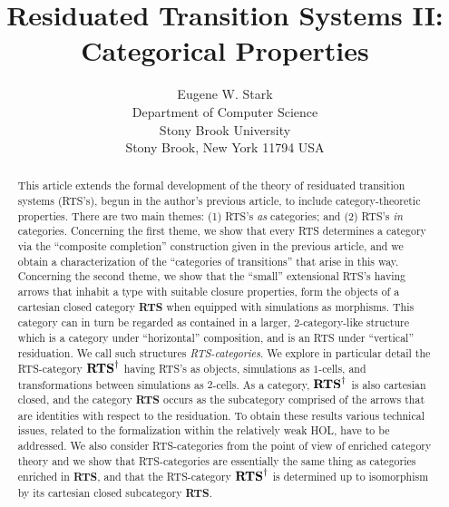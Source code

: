 \documentclass[11pt,notitlepage,a4paper]{report}
\begin{document}
\title{Residuated Transition Systems II:\\ Categorical Properties}
\author{Eugene W. Stark\\[\medskipamount]
        Department of Computer Science\\
        Stony Brook University\\
        Stony Brook, New York 11794 USA}
\maketitle

\begin{abstract}
This article extends the formal development of the theory of residuated transition systems
(RTS's), begun in the author's previous article, to include category-theoretic properties.
There are two main themes: (1) RTS's {\em as} categories; and (2) RTS's {\em in} categories.
Concerning the first theme, we show that every RTS determines a category via the
``composite completion'' construction given in the previous article,
and we obtain a characterization of the ``categories of transitions'' that arise in this way.
Concerning the second theme, we show that the ``small'' extensional RTS's having arrows
that inhabit a type with suitable closure properties, form the objects of a cartesian closed
category {\bf RTS} when equipped with simulations as morphisms.
This category can in turn be regarded as contained in a larger, $2$-category-like structure
which is a category under ``horizontal'' composition, and is an RTS under ``vertical''
residuation.  We call such structures {\em RTS-categories}.
We explore in particular detail the RTS-category ${\bf RTS}^\dagger$ having RTS's as objects,
simulations as $1$-cells, and transformations between simulations as $2$-cells.
As a category, ${\bf RTS}^\dagger$ is also cartesian closed, and the category {\bf RTS}
occurs as the subcategory comprised of the arrows that are identities with respect to the
residuation.
To obtain these results various technical issues, related to the formalization within the
relatively weak HOL, have to be addressed.
We also consider RTS-categories from the point of view of enriched category theory
and we show that RTS-categories are essentially the same thing as categories enriched in {\bf RTS},
and that the RTS-category ${\bf RTS}^\dagger$ is determined up to isomorphism by its
cartesian closed subcategory {\bf RTS}.
\end{abstract}

\newpage
\end{document}

